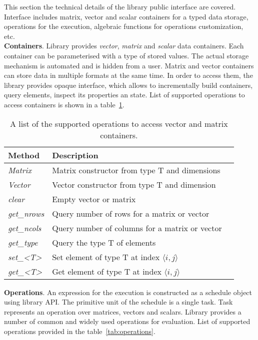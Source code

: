 This section the technical details of the library public interface are covered. Interface includes matrix, vector and scalar containers for a typed data storage, operations for the execution, algebraic functions for operations customization, etc.\\

\textbf{Containers}. Library provides \textit{vector}, \textit{matrix} and \textit{scalar} data containers. Each container can be parameterised with a type of stored values. The actual storage mechanism is automated and is hidden from a user. Matrix and vector containers can store data in multiple formats at the same time. In order to access them, the library provides opaque interface, which allows to incrementally build containers, query elements, inspect its properties an state. List of supported operations to access containers is shown in a table~\ref{tab:containers}.\\

\begin{table}[tbp]
\caption{A list of the supported operations to access vector and matrix containers.}
\begin{center}
    \begin{tabular}{|l|l|l|}
    \hline
    \textbf{Method} & \textbf{Description} \\ \hline
    \hline
    \textit{Matrix} & Matrix constructor from type T and dimensions\\ \hline
    \textit{Vector} & Vector constructor from type T and dimension\\ \hline
    \hline
    \textit{clear} & Empty vector or matrix\\ \hline
    \hline
    \textit{get\_nrows} & Query number of rows for a matrix or vector\\ \hline
    \textit{get\_ncols} & Query number of columns for a matrix or vector\\ \hline
    \textit{get\_type} & Query the type T of elements \\ \hline
    \hline
    \textit{set\_<T>} & Set element of type T at index $\langle i,j\rangle$\\ \hline
    \textit{get\_<T>} & Get element of type T at index $\langle i,j\rangle$\\ \hline
    \end{tabular}
    \label{tab:containers}
\end{center}
\end{table}

\textbf{Operations}. An expression for the execution is constructed as a schedule object using library API. The primitive unit of the schedule is a single task. Task represents an operation over matrices, vectors and scalars. Library provides a number of common and widely used operations for evaluation. List of supported operations provided in the table~\ref{tab:operations}.\\

